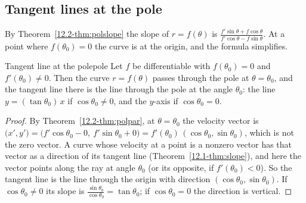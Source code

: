 \documentclass[11pt]{article}
\begin{document}
\subsection*{Tangent lines at the pole}

By Theorem~\ref{12.2-thm:polslope} the slope of $r=f(\theta)$ is $\frac{f'\sin\theta+f\cos\theta}{f'\cos\theta-f\sin\theta}$. At a point where $f(\theta_0)=0$ the curve is at the origin, and the formula simplifies.

\begin{thm}{Tangent line at the pole}{pole}
Let $f$ be differentiable with $f(\theta_0)=0$ and $f'(\theta_0)\ne0$. Then the curve $r=f(\theta)$ passes through the pole at $\theta=\theta_0$, and the tangent line there is the line through the pole at the angle $\theta_0$: the line $y=(\tan\theta_0)\,x$ if $\cos\theta_0\ne0$, and the $y$-axis if $\cos\theta_0=0$.
\end{thm}
\begin{proof}
By Theorem~\ref{12.2-thm:polpar}, at $\theta=\theta_0$ the velocity vector is $\bigl(x',y'\bigr)=\bigl(f'\cos\theta_0-0,\ f'\sin\theta_0+0\bigr)=f'(\theta_0)\,(\cos\theta_0,\sin\theta_0)$, which is not the zero vector. A curve whose velocity at a point is a nonzero vector has that vector as a direction of its tangent line (Theorem~\ref{12.1-thm:slope}), and here the vector points along the ray at angle $\theta_0$ (or its opposite, if $f'(\theta_0)<0$). So the tangent line is the line through the origin with direction $(\cos\theta_0,\sin\theta_0)$. If $\cos\theta_0\ne0$ its slope is $\frac{\sin\theta_0}{\cos\theta_0}=\tan\theta_0$; if $\cos\theta_0=0$ the direction is vertical.
\end{proof}
\end{document}
